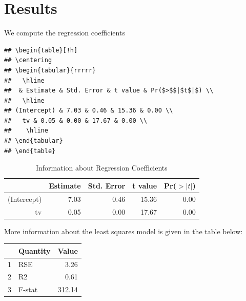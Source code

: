\documentclass{article}\usepackage[]{graphicx}\usepackage[]{color}
\makeatletter
\newenvironment{kframe}{%
 \def\at@end@of@kframe{}%
 \ifinner\ifhmode%
  \def\at@end@of@kframe{\end{minipage}}%
  \begin{minipage}{\columnwidth}%
 \fi\fi%
 \def\FrameCommand##1{\hskip\@totalleftmargin \hskip-\fboxsep
 \colorbox{shadecolor}{##1}\hskip-\fboxsep
     \hskip-\linewidth \hskip-\@totalleftmargin \hskip\columnwidth}%
 \MakeFramed {\advance\hsize-\width
   \@totalleftmargin\z@ \linewidth\hsize
   \@setminipage}}%
 {\par\unskip\endMakeFramed%
 \at@end@of@kframe}
\newenvironment{knitrout}{}{} %
\makeatother
\begin{document}
\section*{Results}
We compute the regression coefficients  
\begin{knitrout}
\color{fgcolor}\begin{kframe}
\begin{verbatim}
## \begin{table}[!h]
## \centering
## \begin{tabular}{rrrrr}
##   \hline
##  & Estimate & Std. Error & t value & Pr($>$$|$t$|$) \\ 
##   \hline
## (Intercept) & 7.03 & 0.46 & 15.36 & 0.00 \\ 
##   tv & 0.05 & 0.00 & 17.67 & 0.00 \\ 
##    \hline
## \end{tabular}
## \end{table}
\end{verbatim}
\end{kframe}
\end{knitrout}

\begin{table}[!h]
\centering
\caption{Information about Regression Coefficients}
\begin{tabular}{rrrrr}
  \hline
 & Estimate & Std. Error & t value & Pr($>|t|$) \\ 
  \hline
(Intercept) & 7.03 & 0.46 & 15.36 & 0.00 \\ 
  tv & 0.05 & 0.00 & 17.67 & 0.00 \\ 
   \hline
\end{tabular}
\end{table}  
More information about the least squares model is given in the table below:  
\begin{table}[ht]
\centering
\begin{tabular}{rlr}
  \hline
 & Quantity & Value \\ 
  \hline
1 & RSE & 3.26 \\ 
  2 & R2 & 0.61 \\ 
  3 & F-stat & 312.14 \\ 
   \hline
\end{tabular}
\end{table}
\end{document}
